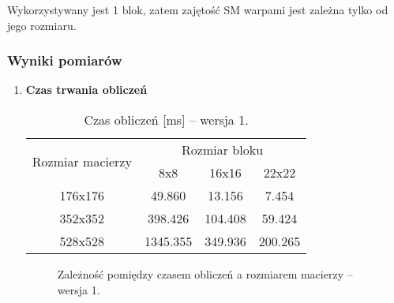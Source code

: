 Wykorzystywany jest 1 blok, zatem zajętość SM warpami jest zależna tylko od jego rozmiaru.

\subsubsection{Wyniki pomiarów}

\begin{enumerate}

\item \textbf{Czas trwania obliczeń} \newline

\begin{table}[H]
\centering
\begin{tabular}{|c|c|c|c|}
\hline
\multirow{2}{*}{Rozmiar macierzy} & \multicolumn{3}{c|}{Rozmiar bloku} \\ \cline{2-4}
& 8x8 & 16x16 & 22x22 \\ \hline
176x176 & 49.860 & 13.156 & 7.454 \\ \hline
352x352 & 398.426 & 104.408 & 59.424 \\ \hline
528x528 & 1345.355 & 349.936 & 200.265 \\ \hline
\end{tabular}
\caption{Czas obliczeń [ms] -- wersja 1.}
\end{table}

\begin{figure}[H]
\centering
\caption{Zależność pomiędzy czasem obliczeń a rozmiarem macierzy -- wersja 1.}
\end{figure}



\end{enumerate}
